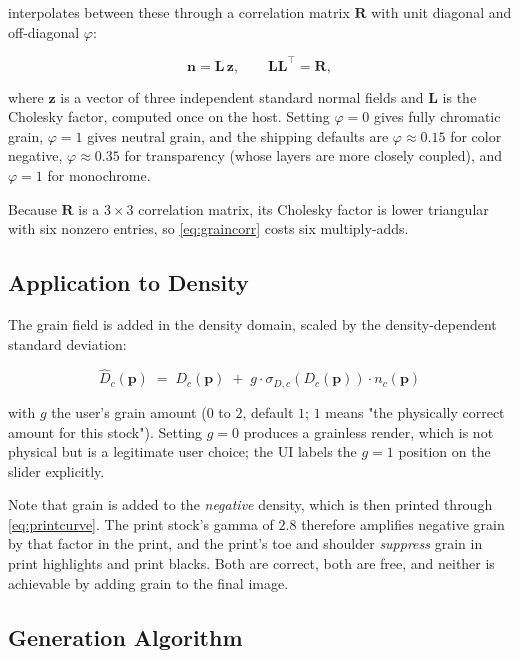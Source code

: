 \EM{} interpolates between these through a correlation matrix
$\mathbf{R}$ with unit diagonal and off-diagonal $\varphi$:

\begin{equation}
\mathbf{n} = \mathbf{L}\, \mathbf{z}, \qquad \mathbf{L}\mathbf{L}^\top = \mathbf{R},
\label{eq:graincorr}
\end{equation}

where $\mathbf{z}$ is a vector of three independent standard normal fields and
$\mathbf{L}$ is the Cholesky factor, computed once on the host. Setting
$\varphi = 0$ gives fully chromatic grain, $\varphi = 1$ gives neutral grain,
and the shipping defaults are $\varphi \approx 0.15$ for color negative,
$\varphi \approx 0.35$ for transparency (whose layers are more closely coupled),
and $\varphi = 1$ for monochrome.

Because $\mathbf{R}$ is a $3\times3$ correlation matrix, its Cholesky factor is
lower triangular with six nonzero entries, so \eqref{eq:graincorr} costs six
multiply-adds.

\subsection{Application to Density}

The grain field is added in the density domain, scaled by the density-dependent
standard deviation:

\begin{equation}
\boxed{\;\hat{D}_c(\mathbf{p}) \;=\; D_c(\mathbf{p}) \;+\; g \cdot \sigma_{D,c}\!\left(D_c(\mathbf{p})\right) \cdot n_c(\mathbf{p})\;}
\label{eq:grainapply}
\end{equation}

with $g$ the user's grain amount ($0$ to $2$, default $1$; $1$ means "the
physically correct amount for this stock"). Setting $g = 0$ produces a
grainless render, which is not physical but is a legitimate user choice; the UI
labels the $g = 1$ position on the slider explicitly.

Note that grain is added to the \emph{negative} density, which is then printed
through \eqref{eq:printcurve}. The print stock's gamma of $2.8$ therefore
amplifies negative grain by that factor in the print, and the print's toe and
shoulder \emph{suppress} grain in print highlights and print blacks. Both are
correct, both are free, and neither is achievable by adding grain to the final
image.

\subsection{Generation Algorithm}

